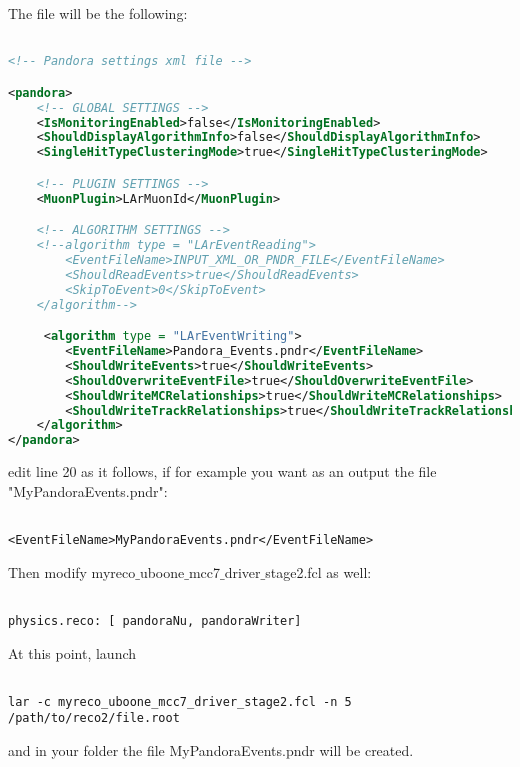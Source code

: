 The file will be the following:

\begin{lstlisting}[language=XML, caption=Python example]

<!-- Pandora settings xml file -->

<pandora>
    <!-- GLOBAL SETTINGS -->
    <IsMonitoringEnabled>false</IsMonitoringEnabled>
    <ShouldDisplayAlgorithmInfo>false</ShouldDisplayAlgorithmInfo>
    <SingleHitTypeClusteringMode>true</SingleHitTypeClusteringMode>

    <!-- PLUGIN SETTINGS -->
    <MuonPlugin>LArMuonId</MuonPlugin>

    <!-- ALGORITHM SETTINGS -->
    <!--algorithm type = "LArEventReading">
        <EventFileName>INPUT_XML_OR_PNDR_FILE</EventFileName>
        <ShouldReadEvents>true</ShouldReadEvents>
        <SkipToEvent>0</SkipToEvent>
    </algorithm-->

     <algorithm type = "LArEventWriting">
        <EventFileName>Pandora_Events.pndr</EventFileName>
        <ShouldWriteEvents>true</ShouldWriteEvents>
        <ShouldOverwriteEventFile>true</ShouldOverwriteEventFile>
        <ShouldWriteMCRelationships>true</ShouldWriteMCRelationships>
        <ShouldWriteTrackRelationships>true</ShouldWriteTrackRelationships>
    </algorithm>
</pandora>

\end{lstlisting}

edit line 20 as it follows, if for example you want as an output the file "MyPandoraEvents.pndr":

\begin{verbatim}

<EventFileName>MyPandoraEvents.pndr</EventFileName>

\end{verbatim}

Then modify myreco${\_}$uboone${\_}$mcc7${\_}$driver${\_}$stage2.fcl as well:

\begin{verbatim}

physics.reco: [ pandoraNu, pandoraWriter]

\end{verbatim}

At this point, launch

\begin{verbatim}

lar -c myreco_uboone_mcc7_driver_stage2.fcl -n 5 /path/to/reco2/file.root 

\end{verbatim}

and in your folder the file MyPandoraEvents.pndr will be created.
